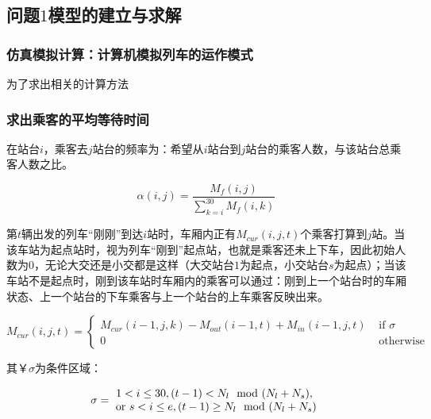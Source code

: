 
\subsection{问题$1$模型的建立与求解}

\subsubsection{仿真模拟计算：计算机模拟列车的运作模式}

为了求出相关的计算方法

\subsubsection{求出乘客的平均等待时间}

在站台$i$，乘客去$j$站台的频率为：希望从$i$站台到$j$站台的乘客人数，与该站台总乘客人数之比。

\begin{equation}
\alpha(i, j) = 
	\frac {M_f(i, j)}{\sum _{k = i} ^{30} M_f(i, k)}
\end{equation}

第$t$辆出发的列车“刚刚”到达$i$站时，车厢内正有$M_{cur}(i, j, t)$个乘客打算到$j$站。当该车站为起点站时，视为列车“刚到”起点站，也就是乘客还未上下车，因此初始人数为$0$，无论大交还是小交都是这样（大交站台$1$为起点，小交站台$s$为起点）；当该车站不是起点时，刚到该车站时车厢内的乘客可以通过：刚到上一个站台时的车厢状态、上一个站台的下车乘客与上一个站台的上车乘客反映出来。

\begin{equation}
M_{cur}(i, j, t) = 
	\begin{cases}
	M_{cur}(i - 1, j, k) - M_{out}(i - 1, t) + M_{in}(i - 1, j, t)  & \text{ if }\sigma \\
	0  & \text{ otherwise }
	\end{cases}
\end{equation}

其$￥\sigma$为条件区域：

\begin{equation}
    \sigma = 
        \begin{matrix}
 		1 < i \leq 30, (t - 1) < N_l \mod (N_l + N_s),  \\
		\text{ or } s < i \leq e, (t - 1) \geq N_l \mod (N_l + N_s)\\
		\end{matrix} \\
\end{equation}

